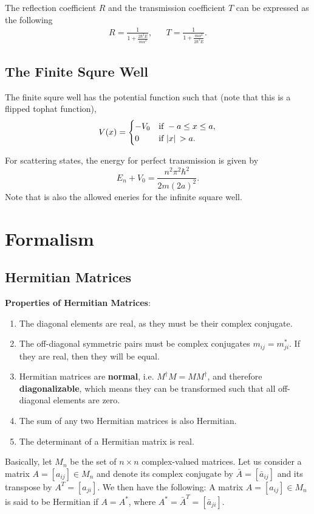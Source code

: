 \documentclass[a4paper]{article}
\begin{document}
\par The reflection coefficient $R$ and the transmission coefficient $T$ can be expressed as the following
\begin{align*}
    R = \frac{1}{1+\frac{2\hbar^2E}{m\alpha^2}}, &&  T = \frac{1}{1+\frac{m\alpha^2}{2\hbar^2E}}.
\end{align*}

\subsection{The Finite Squre Well}
\par The finite squre well has the potential function such that (note that this is a flipped tophat function),
\[
    V(x) = 
        \begin{cases}
            -V_{0} & \text{if } -a \leq x \leq a,\\
            0 & \text{if } \abs*{x} > a.
        \end{cases}    
\]
\par For scattering states, the energy for perfect transmission is given by 
\[
    E_{n}+V_{0} = \frac{n^2\pi^2\hbar^2}{2m(2a)^2}.
\]  
Note that is also the allowed eneries for the infinite square well.

\newpage
\section{Formalism}
\subsection{Hermitian Matrices}
\begin{flushleft}
    \textbf{Properties of Hermitian Matrices}:
\end{flushleft} 
\begin{enumerate}
    \item The diagonal elements are real, as they must be their complex conjugate.
    \item The off-diagonal symmetric pairs must be complex conjugates $m_{ij} = m_{ji}^{*}$. If they are real, then they will be equal.
    \item Hermitian matrices are \textbf{normal}, i.e. $M^{\dagger}M = MM^{\dagger}$, and therefore \textbf{diagonalizable}, which means they can be transformed such that all off-diagonal elements are zero.
    \item The sum of any two Hermitian matrices is also Hermitian.
    \item The determinant of a Hermitian matrix is real.
\end{enumerate}
\par Basically, let $M_n$ be the set of $n \times n$ complex-valued matrices. Let us consider a matrix $A = [a_{ij}] \in M_n$ and denote its complex conjugate by $\bar{A} = [\bar{a}_{ij}]$ and its transpose by $A^T = [a_{ji}]$. We then have the following: A matrix $A = [a_{ij}] \in M_n$ is said to be Hermitian if $A = A^*$, where $A^* = \bar{A}^T = [\bar{a}_{ji}].$
\end{document}
